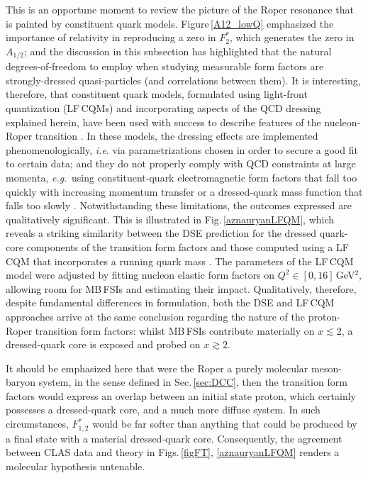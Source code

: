 This is an opportune moment to review the picture of the Roper resonance that is painted by constituent quark models.  Figure\,\ref{A12_lowQ} emphasized the importance of relativity in reproducing a zero in $F_2^\ast$, which generates the zero in $A_{1/2}$; and the discussion in this subsection has highlighted that the natural degrees-of-freedom to employ when studying measurable form factors are strongly-dressed quasi-particles (and correlations between them).  It is interesting, therefore, that constituent quark models, formulated using light-front quantization (LF\,CQMs) and incorporating aspects of the QCD dressing explained herein, have been used with success to describe features of the nucleon-Roper transition \cite{Cardarelli:1996vn, Aznauryan:2012ec, Aznauryan:2016wwm}.
In these models, the dressing effects are implemented phenomenologically, \emph{i.e}. via parametrizations chosen in order to secure a good fit to certain data; and they do not properly comply with QCD constraints at large momenta, \emph{e.g}.\ using constituent-quark electromagnetic form factors that fall too quickly with increasing momentum transfer \cite{Cardarelli:1996vn} or a dressed-quark mass function that falls too slowly \cite{Aznauryan:2012ec}.  Notwithstanding these limitations, the outcomes expressed are qualitatively significant.  This is illustrated in Fig.\,\ref{aznauryanLFQM}, which reveals a striking similarity between the DSE prediction for the dressed quark-core components of the transition form factors and those computed using a LF\,CQM that incorporates a running quark mass \cite{Aznauryan:2016wwm}.  The parameters of the LF\,CQM model were adjusted by fitting nucleon elastic form factors on $Q^2\in [0,16]\,$GeV$^2$, allowing room for MB\,FSIs and estimating their impact.   Qualitatively, therefore, despite fundamental differences in formulation, both the DSE and LF\,CQM approaches arrive at the same conclusion regarding the nature of the proton-Roper transition form factors: whilst MB\,FSIs contribute materially on $x\lesssim 2$, a dressed-quark core is exposed and probed on $x\gtrsim 2$.

It should be emphasized here that were the Roper a purely molecular meson-baryon system, in the sense defined in Sec.\,\ref{sec:DCC}, then the transition form factors would express an overlap between an initial state proton, which certainly possesses a dressed-quark core, and a much more diffuse system.  In such circumstances, $F_{1,2}^\ast$ would be far softer than anything that could be produced by a final state with a material dressed-quark core.  Consequently, the agreement between CLAS data and theory in Figs.\,\ref{figFT}, \ref{aznauryanLFQM} renders a molecular hypothesis untenable.

